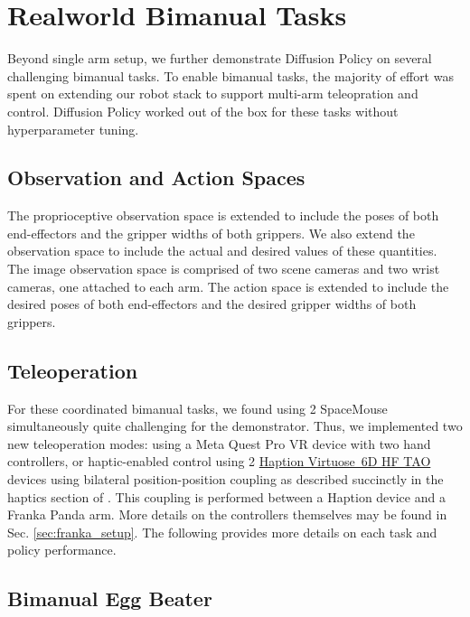 \section{Realworld Bimanual Tasks}
\label{sec:eval_bimanual}
Beyond single arm setup, we further demonstrate Diffusion Policy on several challenging bimanual tasks. To enable bimanual tasks, the majority of effort was spent on extending our robot stack to support multi-arm teleopration and control. Diffusion Policy worked out of the box for these tasks without hyperparameter tuning. 

\subsection{Observation and Action Spaces}
The proprioceptive observation space is extended to include the poses of both end-effectors and the gripper widths of both grippers. We also extend the observation space to include the actual and desired values of these quantities.
The image observation space is comprised of two scene cameras and two wrist cameras, one attached to each arm.
The action space is extended to include the desired poses of both end-effectors and the desired gripper widths of both grippers.

\subsection{Teleoperation}
For these coordinated bimanual tasks, we found using 2 SpaceMouse simultaneously quite challenging for the demonstrator. Thus, we implemented two new teleoperation modes:
using a Meta Quest Pro VR device with two hand controllers, or
haptic-enabled control using 2
\href{https://www.haption.com/en/products-en/virtuose-6d-tao-en.html\#fa-download-downloads}{
Haption Virtuose\legalTM\ 6D HF TAO}
devices using bilateral position-position coupling as described succinctly in the haptics section of \citet{siciliano2008springer}. This coupling is performed between a Haption device and a Franka Panda arm.
More details on the controllers themselves may be found in Sec. \ref{sec:franka_setup}.
The following provides more details on each task and policy performance.  

\subsection{Bimanual Egg Beater}

